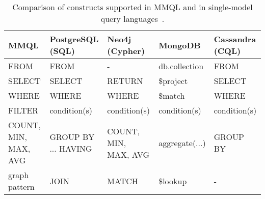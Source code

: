 \begin{scriptsize}
\begin{table}[h]
\caption{Comparison of constructs supported in MMQL and in single-model query languages~\cite{mm_quecat}.}
\label{tab:MM-sparql}
\def\arraystretch{1.2}
\begin{tabular}{
    >{\raggedright\arraybackslash}p{23.9mm}
    |
    >{\raggedright\arraybackslash}p{24.9mm}
    >{\raggedright\arraybackslash}p{23.9mm}
    >{\raggedright\arraybackslash}p{25.9mm}
    >{\raggedright\arraybackslash}p{23.9mm}
    }

\toprule
\textbf{MMQL}  & \textbf{PostgreSQL (SQL)}  & \textbf{Neo4j (Cypher)}  & \textbf{MongoDB}  & \textbf{Cassandra (CQL)} \\
\midrule
FROM & FROM                %
& -            %
& db.collection       & FROM               \\
SELECT & SELECT              %
& RETURN                  %
& \$project & SELECT             \\
WHERE & WHERE               %
& WHERE                   %
& \$match   & WHERE              \\
FILTER & condition(s) & condition(s) & condition(s) & condition(s) \\ %
COUNT, MIN, MAX, AVG & GROUP BY ... HAVING %
& COUNT, MIN, MAX, AVG %
& aggregate(...)       & GROUP BY           \\
graph pattern & JOIN & MATCH & \$lookup & - \\

\end{tabular}
\end{table}
\end{scriptsize}
